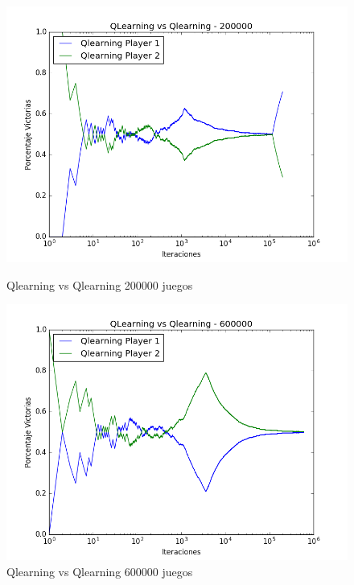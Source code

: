 \begin{figure}[H]
 \centering
 \begin{minipage}{.45\textwidth}
	\centering
	\includegraphics[scale=0.35]{img1/QlearningVsQlearning_200000_6x5_merge.png}
        \caption{Qlearning vs Qlearning 200000 juegos}
  \end{minipage}
 \begin{minipage}{.5\textwidth}
	\centering
	\includegraphics[scale=0.35]{img1/QlearningVsQlearning_600000_6x5_merge.png}
        \caption{Qlearning vs Qlearning 600000 juegos}
  \end{minipage}
\end{figure}


